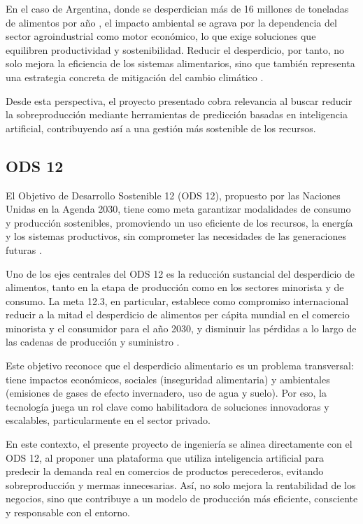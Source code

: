 En el caso de Argentina, donde se desperdician más de 16 millones de toneladas de alimentos por año \parencite{tiscornia2022}, el impacto ambiental se agrava por la dependencia del sector agroindustrial como motor económico, lo que exige soluciones que equilibren productividad y sostenibilidad. Reducir el desperdicio, por tanto, no solo mejora la eficiencia de los sistemas alimentarios, sino que también representa una estrategia concreta de mitigación del cambio climático \parencite{unep2021}.

Desde esta perspectiva, el proyecto presentado cobra relevancia al buscar reducir la sobreproducción mediante herramientas de predicción basadas en inteligencia artificial, contribuyendo así a una gestión más sostenible de los recursos.

\subsection{ODS 12}

El Objetivo de Desarrollo Sostenible 12 (ODS 12), propuesto por las Naciones Unidas en la Agenda 2030, tiene como meta garantizar modalidades de consumo y producción sostenibles, promoviendo un uso eficiente de los recursos, la energía y los sistemas productivos, sin comprometer las necesidades de las generaciones futuras \parencite{onu2015}.

Uno de los ejes centrales del ODS 12 es la reducción sustancial del desperdicio de alimentos, tanto en la etapa de producción como en los sectores minorista y de consumo. La meta 12.3, en particular, establece como compromiso internacional reducir a la mitad el desperdicio de alimentos per cápita mundial en el comercio minorista y el consumidor para el año 2030, y disminuir las pérdidas a lo largo de las cadenas de producción y suministro \parencite{unep2021}.

Este objetivo reconoce que el desperdicio alimentario es un problema transversal: tiene impactos económicos, sociales (inseguridad alimentaria) y ambientales (emisiones de gases de efecto invernadero, uso de agua y suelo). Por eso, la tecnología juega un rol clave como habilitadora de soluciones innovadoras y escalables, particularmente en el sector privado.

En este contexto, el presente proyecto de ingeniería se alinea directamente con el ODS 12, al proponer una plataforma que utiliza inteligencia artificial para predecir la demanda real en comercios de productos perecederos, evitando sobreproducción y mermas innecesarias. Así, no solo mejora la rentabilidad de los negocios, sino que contribuye a un modelo de producción más eficiente, consciente y responsable con el entorno.


